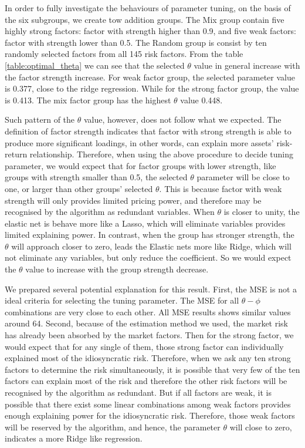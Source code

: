 In order to fully investigate the behaviours of parameter tuning, on the basis of the six subgroups, we create tow addition groups.
The Mix group contain five highly strong factors: factor with strength higher than 0.9, and five weak factors: factor with strength lower than 0.5.
The Random group is consist by ten randomly selected factors from all 145 risk factors.
From the table \ref{table:optimal_theta} we can see that the selected $\theta$ value in general increase with the factor strength increase.
For weak factor group, the selected parameter value is 0.377, close to the ridge regression.
While for the strong factor group, the value is 0.413.
The mix factor group has the highest $\theta$ value 0.448.

Such pattern of the $\theta$ value, however, does not follow what we expected.
The definition of factor strength indicates that factor with strong strength is able to produce more significant loadings, in other words, can explain more assets' risk-return relationship.
Therefore, when using the above procedure to decide tuning parameter, we would expect that for factor groups with lower strength, like groups with strength smaller than 0.5, the selected $\theta$ parameter will be close to one, or larger than other groups' selected $\theta$.
This is because factor with weak strength will only provides limited pricing power, and therefore may be recognised by the algorithm as redundant variables.
When $\theta$ is closer to unity, the elastic net is behave more like a Lasso, which will eliminate variables provides limited explaining power.
In contrast, when the group has stronger strength, the $\theta$ will approach closer to zero, leads the Elastic nets more like Ridge, which will not eliminate any variables, but only reduce the coefficient.
So we would expect the $\theta$ value to increase with the group strength decrease.

We prepared several potential explanation for this result.
First, the MSE is not a ideal criteria for selecting the tuning parameter.
The MSE for all $\theta - \phi$ combinations are very close to each other.
All MSE results shows similar values around 64.
Second, because of the estimation method we used, the market risk has already been absorbed by the market factors.
Then for the strong factor, we would expect that for any single of them, those strong factor can individually explained most of the idiosyncratic risk.
Therefore, when we ask any ten strong factors to determine the risk simultaneously, it is possible that very few of the ten factors can explain most of the risk and therefore the other risk factors will be recognised by the algorithm as redundant.
But if all factors are weak, it is possible that there exist some linear combinations among weak factors provides enough explaining power for the idiosyncratic risk.
Therefore, those weak factors will be reserved by the algorithm, and hence, the parameter $\theta$ will close to zero, indicates a more Ridge like regression.





